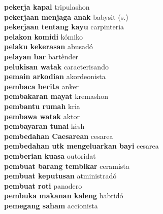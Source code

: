 \textbf{ pekerja kapal  } tripulashon \\
\textbf{ pekerjaan menjaga anak  } babysit (s.) \\
\textbf{ pekerjaan tentang kayu  } carpinteria \\
\textbf{ pelakon komidi  } kómiko \\
\textbf{ pelaku kekerasan  } abusadó \\
\textbf{ pelayan bar  } bartènder \\
\textbf{ pelukisan watak  } caracterisando \\
\textbf{ pemain arkodian  } akordeonista \\
\textbf{ pembaca berita  } anker \\
\textbf{ pembakaran mayat  } kremashon \\
\textbf{ pembantu rumah  } kria \\
\textbf{ pembawa watak  } aktor \\
\textbf{ pembayaran tunai  } kèsh \\
\textbf{ pembedahan Caesarean  } cesarea \\
\textbf{ pembedahan utk mengeluarkan bayi  } cesarea \\
\textbf{ pemberian kuasa  } outoridat \\
\textbf{ pembuat barang tembikar  } ceramista \\
\textbf{ pembuat keputusan  } atministradó \\
\textbf{ pembuat roti  } panadero \\
\textbf{ pembuka makanan kaleng  } habridó \\
\textbf{ pemegang saham  } accionista \\
